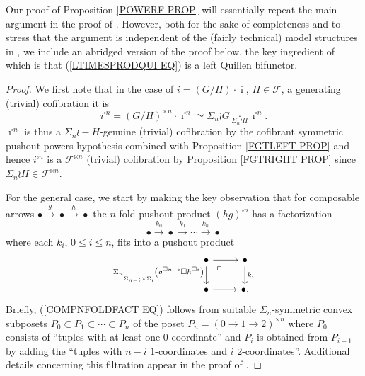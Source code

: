 \documentclass[a4paper,10pt]{article}%
\begin{document}
Our proof of Proposition \ref{POWERF PROP} will essentially repeat the main argument in the proof of
\cite[Thm. 1.2]{Pe16}.
However, both for the sake of completeness and to stress that the argument is independent of the (fairly technical) model structures in \cite{Pe16}, we include an abridged version of the proof below, the key ingredient 
of which is that (\ref{LTIMESPRODQUI EQ}) is a left Quillen bifunctor. 


\begin{proof}
  We first note that in the case of 
  $i = (G/H) \cdot \bar{\imath}$, $H\in \mathcal{F}$, a generating (trivial) cofibration it is 
  \[i^{\square n} = 
  (G/H)^{\times n} \cdot \bar{\imath}^{\square n}
  \simeq \Sigma_n \wr G 
  \underset{\Sigma_n \wr H}{\cdot} \bar{\imath}^{\square n}.\]
  $\bar{\imath}^{\square n}$ is thus a $\Sigma_n \wr-H$-genuine (trivial) cofibration by the cofibrant symmetric pushout powers hypothesis combined with Proposition \ref{FGTLEFT PROP} and hence 
  $i^{\square n}$ is a $\mathcal{F}^{\ltimes n}$ 
  (trivial) cofibration by Proposition \ref{FGTRIGHT PROP}
  since $\Sigma_n \wr H \in \mathcal{F}^{\ltimes n}$.


  For the general case, we start by making the key observation that for composable arrows 
  $\bullet \xrightarrow{g} \bullet \xrightarrow{h} \bullet$ the $n$-fold pushout product $(hg)^{\square n}$ has a factorization
  \begin{equation}\label{COMPNFOLDFACT EQ}
    \bullet
    \xrightarrow{k_0}
    \bullet
    \xrightarrow{k_1}
    \cdots
    \xrightarrow{k_n}
    \bullet
  \end{equation}
  where each $k_i$, $0 \leq i \leq n$, fits into a pushout product
  \begin{equation}\label{COMPNFOLDFACTPUSH EQ}
    \begin{tikzcd}
      \bullet \ar{r} \ar{d}[swap] 
      {\Sigma_n \underset{\Sigma_{n-i} \times \Sigma_i}
	{\cdot}\left( g^{\square n-i} \square h^{\square i} \right)} 
      \ar[dr,phantom, "\ulcorner", near start]
      &
      \bullet \ar{d}{k_i}
      \\
      \bullet \ar{r} 
      &
      \bullet.
    \end{tikzcd}
  \end{equation}
  Briefly, (\ref{COMPNFOLDFACT EQ}) follows from suitable $\Sigma_n$-symmetric convex subposets 
  $P_0 \subset P_1 \subset \cdots \subset P_n$
  of the poset $P_n = (0 \to 1 \to 2)^{\times n}$ 
  where $P_0$ consists of ``tuples with at least one $0$-coordinate'' and $P_i$ is obtained from $P_{i-1}$ by adding the ``tuples with $n-i$ $1$-coordinates and $i$ $2$-coordinates''.
  Additional details concerning this filtration appear in the proof of \cite[Lemma 4.8]{Pe16}.



\end{proof}
\end{document}
